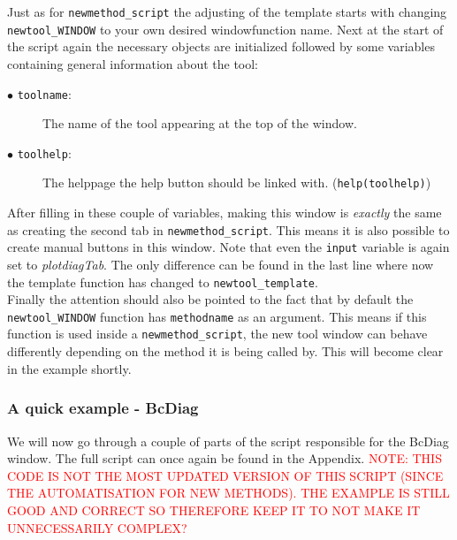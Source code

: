 \documentclass[a4paper]{article}\usepackage[]{graphicx}\usepackage[]{color}
\begin{document}
\noindent Just as for \verb|newmethod_script| the adjusting of the template
starts with changing \verb|newtool_WINDOW| to your own desired windowfunction
name. Next at the start of the script again the necessary objects are
initialized followed by some variables containing general information about the
tool:
\begin{description}
  \item[$\bullet$ \texttt{toolname}:] The name of the tool appearing at the top
  of the window. 
  \item[$\bullet$ \texttt{toolhelp}:] The helppage the help button should be
  linked with. (\verb|help(toolhelp)|)
\end{description}
\noindent After filling in these couple of variables, making this window is {\it
exactly} the same as creating the second tab in \verb|newmethod_script|. This
means it is also possible to create manual buttons in this window. Note that
even the \verb|input| variable is again set to {\it plotdiagTab}. The only
difference can be found in the last line where now the template function has
changed to \verb|newtool_template|.\\
Finally the attention should also be pointed to the fact that by default the
\verb|newtool_WINDOW| function has \verb|methodname| as an argument. This means
if this function is used inside a \verb|newmethod_script|, the new tool window
can behave differently depending on the method it is being called by. This will
become clear in the example shortly. 

\subsubsection{A quick example - BcDiag}
\noindent We will now go through a couple of parts of the script responsible for
the BcDiag window. The full script can once again be found in the Appendix.
\textcolor{red}{NOTE: THIS CODE IS NOT THE MOST UPDATED VERSION OF THIS SCRIPT (SINCE THE AUTOMATISATION FOR NEW METHODS). THE EXAMPLE IS STILL GOOD AND CORRECT SO THEREFORE KEEP IT TO NOT MAKE IT UNNECESSARILY COMPLEX?}
\end{document}
